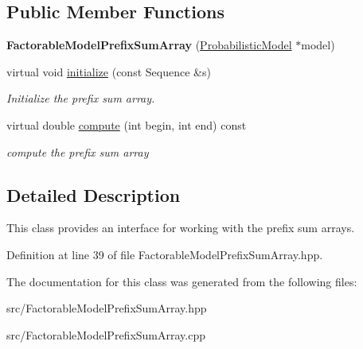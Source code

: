 \subsection*{Public Member Functions}
\begin{DoxyCompactItemize}
\item 
\mbox{\label{classtops_1_1FactorableModelPrefixSumArray_ac88c3a1b88fa965d9c58e5a0193d6cb7}} 
{\bfseries Factorable\+Model\+Prefix\+Sum\+Array} (\hyperlink{classtops_1_1ProbabilisticModel}{Probabilistic\+Model} $\ast$model)
\item 
\mbox{\label{classtops_1_1FactorableModelPrefixSumArray_ad71ce1bff5834ff45717712999c96c5d}} 
virtual void \hyperlink{classtops_1_1FactorableModelPrefixSumArray_ad71ce1bff5834ff45717712999c96c5d}{initialize} (const Sequence \&s)
\begin{DoxyCompactList}\small\item\em Initialize the prefix sum array. \end{DoxyCompactList}\item 
\mbox{\label{classtops_1_1FactorableModelPrefixSumArray_a850580f8103692abc204cbf82af49c18}} 
virtual double \hyperlink{classtops_1_1FactorableModelPrefixSumArray_a850580f8103692abc204cbf82af49c18}{compute} (int begin, int end) const
\begin{DoxyCompactList}\small\item\em compute the prefix sum array \end{DoxyCompactList}\end{DoxyCompactItemize}


\subsection{Detailed Description}
This class provides an interface for working with the prefix sum arrays. 

Definition at line 39 of file Factorable\+Model\+Prefix\+Sum\+Array.\+hpp.



The documentation for this class was generated from the following files\+:\begin{DoxyCompactItemize}
\item 
src/Factorable\+Model\+Prefix\+Sum\+Array.\+hpp\item 
src/Factorable\+Model\+Prefix\+Sum\+Array.\+cpp\end{DoxyCompactItemize}
